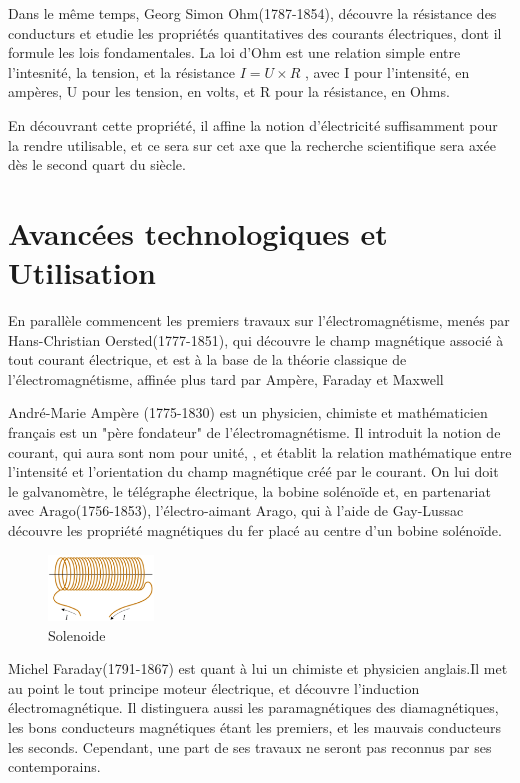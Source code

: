 \documentclass[12pt]{report}
\begin{document}
Dans le même temps, Georg Simon Ohm(1787-1854), découvre la résistance des conducturs et etudie les propriétés quantitatives des courants électriques, dont il formule les lois fondamentales. La loi d'Ohm est une relation simple entre l'intesnité, la tension, et la résistance \( I = U \times R \) , avec I pour l'intensité, en ampères, U pour les tension, en volts, et R pour la résistance, en Ohms.
    
    En découvrant cette propriété, il affine la notion d'électricité suffisamment pour la rendre utilisable, et ce sera sur cet axe que la recherche scientifique sera axée dès le second quart du siècle.
\section{Avancées technologiques et Utilisation}
En parallèle commencent les premiers travaux sur l'électromagnétisme, menés par Hans-Christian Oersted(1777-1851), qui découvre le champ magnétique associé à tout courant électrique, et est à la base de la théorie classique de l'électromagnétisme, affinée plus tard par Ampère, Faraday et Maxwell


André-Marie Ampère (1775-1830) est un physicien, chimiste et mathématicien français est un "père fondateur" de l'électromagnétisme. Il introduit la notion de courant, qui aura sont nom pour unité, , et établit la relation mathématique entre l'intensité et l'orientation du champ magnétique créé par le courant. On lui doit le galvanomètre, le télégraphe électrique, la bobine solénoïde et, en partenariat avec Arago(1756-1853), l'électro-aimant
Arago, qui à l'aide de Gay-Lussac découvre les propriété magnétiques du fer placé au centre d'un bobine solénoïde.

\begin{figure}
  \begin{center}
    \includegraphics[width=0.25\textwidth]{solenoide}
  \end{center}
  \caption{Solenoide}
\end{figure}
Michel Faraday(1791-1867) est quant à lui un chimiste et physicien anglais.Il met au point le tout principe moteur électrique, et découvre l'induction électromagnétique. Il distinguera aussi les paramagnétiques des diamagnétiques, les bons conducteurs magnétiques étant les premiers, et les mauvais conducteurs les seconds.
Cependant, une part de ses travaux ne seront pas reconnus par ses contemporains.
\end{document}
